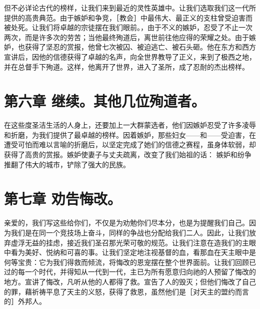 但不必详论古代的榜样，让我们来到最近的灵性英雄中。让我们选取我们这一代所提供的高贵典范。由于嫉妒和争竞，［教会］中最伟大、最正义的支柱曾受迫害而被处死。让我们将卓越的宗徒摆在我们眼前。，由于不义的嫉妒，忍受了不止一次两次，而是许多次的劳苦；当他最终殉道后，离世前往他应得的荣耀之处。由于嫉妒，也获得了坚忍的赏报，他曾七次被囚、被迫逃亡、被石头砸。他在东方和西方宣讲后，因他的信德获得了卓越的名声，向全世界教导了正义，来到了极西之地，并在总督手下殉道。这样，他离开了世界，进入了圣所，成了忍耐的杰出榜样。\par


\section{第六章 继续。其他几位殉道者。}

在这些度圣洁生活的人身上，还要加上一大群蒙选者，他们因嫉妒忍受了许多凌辱和折磨，为我们提供了最卓越的榜样。因着嫉妒，那些妇女——和——受迫害，在遭受可怕而难以言喻的折磨后，以坚定完成了她们的信德之赛程，虽身体软弱，却获得了高贵的赏报。嫉妒使妻子与丈夫疏离，改变了我们始祖的话：  嫉妒和纷争推翻了伟大的城市，铲除了强大的民族。\par


\section{第七章 劝告悔改。}

亲爱的，我们写这些给你们，不仅是为劝勉你们尽本分，也是为提醒我们自己。因为我们是在同一个竞技场上奋斗，同样的争战也分配给我们二人。因此，让我们放弃虚浮无益的挂虑，接近我们圣召那光荣可敬的规范。让我们注意在造我们的主眼中看为美好、悦纳和可喜的事。让我们坚定地注视基督的血，看那血在天主眼中是何等宝贵：它为我们得救而倾流，将悔改的恩宠摆在整个世界面前。让我们回顾已过的每一个时代，并得知从一代到一代，主已为所有愿意归向祂的人预留了悔改的地方。宣讲了悔改，凡听从他的人都得了救。宣告了人的毁灭；但他们悔改了自己的罪，藉祈祷平息了天主的义怒，获得了救恩，虽然他们是［对天主的盟约而言的］外邦人。\par


